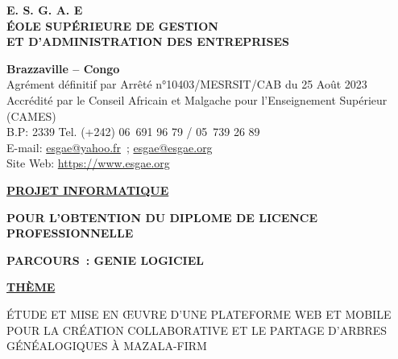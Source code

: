 \begin{titlepage}
  \begin{center}

    \large {
      \textbf{
        E. S. G. A. E \\
        ÉOLE SUPÉRIEURE DE GESTION \\
        ET D’ADMINISTRATION DES ENTREPRISES \\
      }
    }

    \vspace{0.2cm}

    \large {
      \textbf{ Brazzaville – Congo } \\
      Agrément définitif par Arrêté n°10403/MESRSIT/CAB du 25 Août 2023 \\
      Accrédité par le Conseil Africain et Malgache pour l’Enseignement Supérieur (CAMES) \\
      B.P: 2339 Tel. (+242) 06 691 96 79 / 05 739 26 89 \\
      E-mail: \href{mailto:esgae@yahoo.fr}{esgae@yahoo.fr} ; \href{mailto:esgae@esgae.org}{esgae@esgae.org} \\
      Site Web: \url {https://www.esgae.org} \\
    }

    \vspace{0.5cm}

    \dotfill

    \vspace{0.5cm}

    \large {
      \textbf { \underline {PROJET INFORMATIQUE} }
    }

    \vspace{0.2cm}
    \large {
      \textbf{POUR L’OBTENTION DU DIPLOME DE LICENCE PROFESSIONNELLE}
    }

    \vspace{0.2cm}
    \large {
      \textbf{PARCOURS : GENIE LOGICIEL}
    }

    \vspace{1.5cm}

    \normalsize {
    \textbf { \underline {THÈME} }
    }

    \begin{tcolorbox}[sharp corners=uphill,
    arc=6mm,boxrule=2mm,boxsep=5mm,
    ]
    \centering
    \large {
      ÉTUDE ET MISE EN ŒUVRE D’UNE PLATEFORME WEB ET MOBILE POUR LA CRÉATION
      COLLABORATIVE ET LE PARTAGE D’ARBRES GÉNÉALOGIQUES À MAZALA-FIRM
    }
    \end{tcolorbox}
  \end{center}


\end{titlepage}
